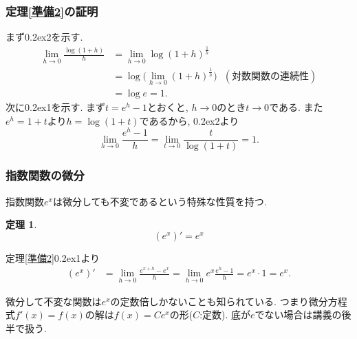 \documentclass[dvipdfmx,cjk,10.2pt]{beamer}
\newcommand{\ctext}[1]{\raise0.2ex\hbox{\textcircled{\scriptsize{#1}}}}
\theoremstyle{definition}
\newtheorem{Thm}{定理}[section]
\begin{document}
\begin{frame}
\frametitle{定理\ref{準備2}の証明}

まず\ctext{2}を示す. 
\begin{align*} 
\lim_{h \to 0} \frac{\log(1+h)}{h} & = \lim_{h \to 0} \log(1+h)^{\frac{1}{h}} \\
& = \log \big( \lim_{h \to 0} (1+h)^{\frac{1}{h}} \big) \ \ \ (\text{対数関数の連続性})\\
& = \log e = 1. 
\end{align*}
次に\ctext{1}を示す. 
まず$t=e^h-1$とおくと, $h\to 0$のとき$t\to0$である. 
また$e^h=1+t$より$h=\log (1+t)$であるから, \ctext{2}より
$$
\lim_{h \to 0} \frac{e^h-1}{h}=\lim_{t \to 0} \frac{t}{\log(1+t)}=1. 
$$

\end{frame}




\begin{frame}
\frametitle{指数関数の微分}

 指数関数$e^x$は微分しても不変であるという特殊な性質を持つ. 

\begin{Thm} 
$$(e^x)'=e^x$$
\end{Thm}

定理\ref{準備2}\ctext{1}より
\begin{align*} 
(e^x)' &= \lim_{h\to0}\frac{e^{x+h}-e^x}{h}=\lim_{h\to0}e^x \frac{e^h-1}{h}=e^x\cdot 1 = e^x. 
\end{align*}

微分して不変な関数は$e^x$の定数倍しかないことも知られている. 
つまり微分方程式$f'(x)=f(x)$の解は$f(x)=Ce^x$の形($C$:定数). 
底が$e$でない場合は講義の後半で扱う. 

\end{frame}



\end{document}
